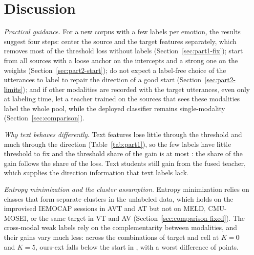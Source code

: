 \section{Discussion}
\label{sec:discussion}

\emph{Practical guidance.}
For a new corpus with a few labels per emotion, the results suggest four steps: center the source and the target features separately, which removes most of the threshold loss without labels (Section~\ref{sec:part1-fix}); start from all sources with a loose anchor on the intercepts and a strong one on the weights (Section~\ref{sec:part2-start}); do not expect a label-free choice of the utterances to label to repair the direction of a good start (Section~\ref{sec:part2-limits}); and if other modalities are recorded with the target utterances, even only at labeling time, let a teacher trained on the sources that sees these modalities label the whole pool, while the deployed classifier remains single-modality (Section~\ref{sec:comparison}).

\emph{Why text behaves differently.}
Text features lose little through the threshold and much through the direction (Table~\ref{tab:part1}), so the few labels have little threshold to fix and the threshold share of the gain is at most : the share of the gain follows the share of the loss. Text students still gain from the fused teacher, which supplies the direction information that text labels lack.

\emph{Entropy minimization and the cluster assumption.}
Entropy minimization relies on classes that form separate clusters in the unlabeled data, which holds on the improvised IEMOCAP sessions in AVT and AT but not on MELD, CMU-MOSEI, or the same target in VT and AV (Section~\ref{sec:comparison-fixed}).
The cross-modal weak labels rely on the complementarity between modalities, and their gains vary much less: across the  combinations of target and cell at $K=0$ and $K=5$, ours-ext falls below the start in , with a worst difference of  points.

